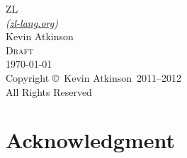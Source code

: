\documentclass[12pt]{report}
\newenvironment{code}
  {\Verbatim[xleftmargin=0.8em,fontsize=\small,baselinestretch=1.0,samepage=true]}
  {\endVerbatim\vspace{-2.6pt plus -0.87pt minus -0.87pt}}
\begin{document}


\begin{titlepage}
\begin{center}
\vspace*{\fill}
{\huge ZL\\[0.5em]}
{\large \it (\href{http://zl-lang.org}{zl-lang.org})}\\[\fill]
{\large Kevin Atkinson}\\[\fill]
{\Large \textsc{Draft}\\[0.5em]}
{\large \today}\\[\fill]
Copyright \copyright\ Kevin Atkinson\ 2011--2012\\
All Rights Reserved
\end{center}
\end{titlepage}

\pagebreak
\setcounter{page}{2}

\begingroup
\onehalfspacing


%

\chapter*{Acknowledgment}


\endgroup

\tableofcontents

\pagebreak
\setcounter{page}{1}

\begingroup
\onehalfspacing



\endgroup



\end{document}
